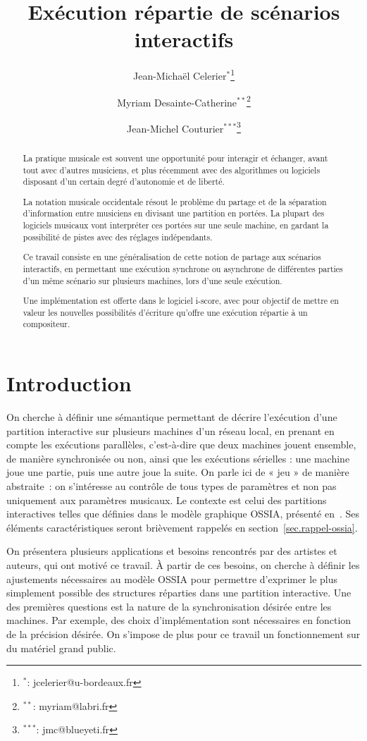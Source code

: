 \documentclass[10pt]{article}
\title{Exécution répartie de scénarios interactifs}
\author[1,2]{Jean-Michaël Celerier$^*$\thanks{$^*$: jcelerier@u-bordeaux.fr}}
\author[1]{Myriam Desainte-Catherine$^{**}$\thanks{$^{**}$: myriam@labri.fr}}
\author[2]{Jean-Michel Couturier$^{***}$\thanks{$^{***}$: jmc@blueyeti.fr}}
\affil[1]{Univ. Bordeaux, LaBRI, UMR 5800, F-33400 Talence, France}
\affil[2]{ Blue Yeti, F-17110 France}
\newcommand\ossia{OSSIA\xspace}
\begin{document}
\maketitle
\begin{abstract}
La pratique musicale est souvent une opportunité pour interagir et échanger, avant tout avec d'autres musiciens, et plus récemment avec des algorithmes ou logiciels disposant d'un certain degré d'autonomie et de liberté.

La notation musicale occidentale résout le problème du partage et de la séparation d'information entre musiciens en divisant une partition en portées. 
La plupart des logiciels musicaux vont interpréter ces portées sur une seule machine, en gardant la possibilité de pistes avec des réglages indépendants. 

Ce travail consiste en une généralisation de cette notion de partage aux scénarios interactifs, en permettant une exécution synchrone ou asynchrone de différentes parties d'un même scénario sur plusieurs machines, lors d'une seule exécution.

Une implémentation est offerte dans le logiciel i-score, avec pour objectif de mettre en valeur les nouvelles possibilités d'écriture qu'offre une exécution répartie à un compositeur.
\end{abstract}

\section{Introduction}
On cherche à définir une sémantique permettant de décrire l'exécution d'une partition interactive sur plusieurs machines d'un réseau local, en prenant en compte les exécutions parallèles, c'est-à-dire que deux machines jouent ensemble, de manière synchronisée ou non, ainsi que les exécutions sérielles : une machine joue une partie, puis une autre joue la suite.
On parle ici de « jeu » de manière abstraite~: on s'intéresse au contrôle de tous types de paramètres et non pas uniquement aux paramètres musicaux.
Le contexte est celui des partitions interactives telles que définies dans le modèle graphique \ossia, présenté en~\cite{celerier2015ossia}. 
Ses éléments caractéristiques seront brièvement rappelés en section~\ref{sec.rappel-ossia}.

On présentera plusieurs applications et besoins rencontrés par des artistes et auteurs, qui ont motivé ce travail.
À partir de ces besoins, on cherche à définir les ajustements nécessaires au modèle \ossia pour permettre d'exprimer le plus simplement possible des structures réparties dans une partition interactive.
Une des premières questions est la nature de la synchronisation désirée entre les machines.
Par exemple, des choix d'implémentation sont nécessaires en fonction de la précision désirée. 
On s'impose de plus pour ce travail un fonctionnement sur du matériel grand public.
\end{document}
